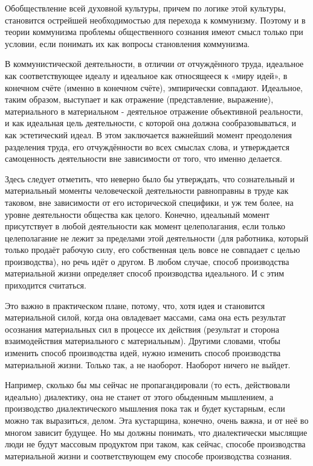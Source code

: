 \documentclass[12pt,a4paper,openany]{book}
\begin{document}
Обобществление всей духовной культуры, причем по логике этой культуры, становится острейшей необходимостью для перехода к коммунизму. Поэтому и в теории коммунизма проблемы общественного сознания имеют смысл только при условии, если понимать их как вопросы становления коммунизма.

В коммунистической деятельности, в отличии от отчуждённого труда, идеальное как соответствующее идеалу и идеальное как относящееся к «миру идей», в конечном счёте (именно в конечном счёте), эмпирически совпадают. Идеальное, таким образом, выступает и как отражение (представление, выражение), материального в материальном - деятельное отражение объективной реальности, и как идеальная цель деятельности, с которой она должна сообразовываться, и как эстетический идеал. В этом заключается важнейший момент преодоления разделения труда, его отчуждённости во всех смыслах слова, и утверждается самоценность деятельности вне зависимости от того, что именно делается.

Здесь следует отметить, что неверно было бы утверждать, что сознательный и материальный моменты человеческой деятельности равноправны в труде как таковом, вне зависимости от его исторической специфики, и уж тем более, на уровне деятельности общества как целого. Конечно, идеальный момент присутствует в любой деятельности как момент целеполагания, если только целеполагание не лежит за пределами этой деятельности (для работника, который только продаёт рабочую силу, его собственная цель вовсе не совпадает с целью производства), но речь идёт о другом. В любом случае, способ производства материальной жизни определяет способ производства идеального. И с этим приходится считаться.

Это важно в практическом плане, потому, что, хотя идея и становится материальной силой, когда она овладевает массами, сама она есть результат осознания материальных сил в процессе их действия (результат и сторона взаимодействия материального с материальным). Другими словами, чтобы изменить способ производства идей, нужно изменить способ производства материальной жизни. Только так, а не наоборот. Наоборот ничего не выйдет.

Например, сколько бы мы сейчас не пропагандировали (то есть, действовали идеально) диалектику, она не станет от этого обыденным мышлением, а производство диалектического мышления пока так и будет кустарным, если можно так выразиться, делом. Эта кустарщина, конечно, очень важна, и от неё во многом зависит будущее. Но мы должны понимать, что диалектически мыслящие люди не будут массовым продуктом при таком, как сейчас, способе производства материальной жизни и соответствующем ему способе производства сознания.
\end{document}
